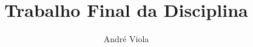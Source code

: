 \documentclass{article}
\title{Trabalho Final da Disciplina}
\author{André Viola}
\begin{document}
  \onehalfspacing
\maketitle
 
\end{document}

